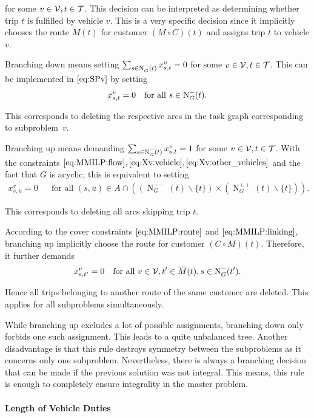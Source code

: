 for some $v\in\mathcal{V}, t\in\mathcal{T}$. This decision can be interpreted as determining whether trip $t$ is fulfilled by vehicle $v$. This is a very specific decision since it implicitly chooses the route $M(t)$ for customer $(M\circ C)(t)$ and assigns trip $t$ to vehicle $v$.

Branching down means setting ${\sum_{s\in\operatorname{N}_G^-(t)} x^v_{s,t} = 0}$ for some $v\in\mathcal{V}, t\in\mathcal{T}$. This can be implemented in $\eqref{eq:SPv}$ by setting
\begin{align*}
	x^v_{s,t}=0 && \text{for all } s\in\operatorname{N}_G^-(t).
\end{align*}

This corresponds to deleting the respective arcs in the task graph corresponding to subproblem~$v$.

Branching up means demanding ${\sum_{s\in\operatorname{N}_G^-(t)} x^v_{s,t} = 1}$ for some $v\in\mathcal{V}, t\in\mathcal{T}$. With the constraints $\eqref{eq:MMILP:flow}, \eqref{eq:Xv:vehicle}, \eqref{eq:Xv:other_vehicles}$ and the fact that $G$ is acyclic, this is equivalent to setting
\begin{align*}
	x^v_{s,u} = 0 && \text{for all } (s,u)\in A\cap\left(\left(\operatorname{N}_G^{--}(t)\backslash\{t\}\right)\times\left(\operatorname{N}_G^{++}(t)\backslash\{t\}\right)\right).
\end{align*}

This corresponds to deleting all arcs skipping trip $t$.

According to the cover constraints $\eqref{eq:MMILP:route}$ and $\eqref{eq:MMILP:linking}$, branching up implicitly choose the route for customer $(C\circ M)(t)$. Therefore, it further demands
\begin{align*}
	x^v_{s,t'} = 0 && \text{for all } v\in\mathcal{V}, t'\in\overline{M}(t), s\in\operatorname{N}_G^-(t').
\end{align*}

Hence all trips belonging to another route of the same customer are deleted. This applies for all subproblems simultaneously.

While branching up excludes a lot of possible assignments, branching down only forbids one such assignment. This leads to a quite unbalanced tree. Another disadvantage is that this rule destroys symmetry between the subproblems as it concerns only one subproblem. Nevertheless, there is always a branching decision that can be made if the previous solution was not integral. This means, this rule is enough to completely ensure integrality in the master problem.

\paragraph{Length of Vehicle Duties} \parfill

